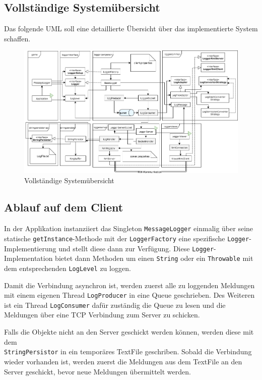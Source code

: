 \documentclass[12pt,a4paper,twosided]{scrartcl}
\begin{document}
\begin{landscape}
	\subsection{Vollständige Systemübersicht}
	Das folgende UML soll eine detaillierte Übersicht über das implementierte System schaffen.
	
	\begin{figure}[h]
		\centering
		\includegraphics[width=0.9\linewidth]{img/VSK_UML}
		\caption{Vollständige Systemübersicht}
		\label{fig:vskuml}
		\vspace{-1cm}
	\end{figure}
\end{landscape}

\subsection{Ablauf auf dem Client}
In der Applikation instanziiert das Singleton \texttt{MessageLogger} einmalig über seine statische  \texttt{getInstance}-Methode mit der  \texttt{LoggerFactory} eine spezifische  \texttt{Logger}-Implementierung und stellt diese dann zur Verfügung. Diese  \texttt{Logger}-Implementation bietet dann Methoden um einen  \texttt{String} oder ein  \texttt{Throwable} mit dem entsprechenden  \texttt{LogLevel} zu loggen. 

Damit die Verbindung asynchron ist, werden zuerst alle zu loggenden
Meldungen mit einem eigenen Thread  \texttt{LogProducer} in eine Queue geschrieben. Des Weiteren ist ein Thread  \texttt{LogConsumer} dafür zuständig die Queue zu lesen und die Meldungen über eine TCP Verbindung zum Server zu schicken. 

Falls die Objekte nicht an den Server geschickt werden können, werden diese mit dem \\ \texttt{StringPersistor} in ein temporäres TextFile geschriben. Sobald die Verbindung wieder vorhanden ist, werden zuerst die Meldungen aus dem TextFile an den Server geschickt, bevor neue Meldungen übermittelt werden.
\end{document}

